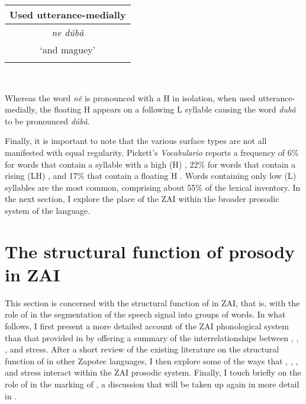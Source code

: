 \begin{table}

\begin{tabular}{ c }
\midrule
Used utterance-medially \\

\midrule
\textit{n{e}}  \textit{d\'{u}b\v{a}} \\
`and maguey' \\

\lspbottomrule
\end{tabular} \\

\end{table}

Whereas the word \textit{n\v{e}} is pronounced with a H  in isolation, when used utterance-medially, the floating H  appears on a following L  syllable causing the word \textit{dub\v{a}} to be pronounced \textit{d\'{u}b\v{a}}.

Finally, it is important to note that the various surface  types are not all manifested with equal regularity. Pickett's \textit{Vocabulario} \citep{pickett1979} reports a frequency of 6\% for words that contain a syllable with a high (H) , 22\% for words that contain a rising (LH) , and 17\% that contain a floating H . Words containing only low (L)  syllables are the most common, comprising about 55\% of the lexical inventory. In the next section, I explore the place of the ZAI  within the broader prosodic system of the language.


\section{The structural function of prosody in ZAI}\label{prosody}

This section is concerned with the structural function of  in ZAI, that is, with the role of  in the segmentation of the speech signal into groups of words. In what follows, I first present a more detailed account of the ZAI phonological system than that provided in  by offering a summary of the interrelationships between , , , and stress. After a short review of the existing literature on the structural function of  in other Zapotec languages, I then explore some of the ways that , , , and stress interact within the ZAI prosodic system. Finally, I touch briefly on the role of  in the marking of , a discussion that will be taken up again in more detail in .


